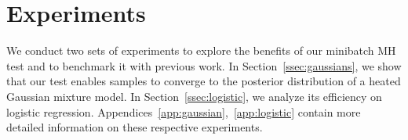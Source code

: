 \documentclass{article}
\newtheorem{theorem}{Theorem}
\begin{document}






\section{Experiments}\label{sec:experiments}

We conduct two sets of experiments to explore the benefits of our minibatch MH test and to
benchmark it with previous work. In Section~\ref{ssec:gaussians}, we show that our test enables
samples to converge to the posterior distribution of a heated Gaussian mixture model. In
Section~\ref{ssec:logistic}, we analyze its efficiency on logistic regression. 
Appendices~\ref{app:gaussian},~\ref{app:logistic} %
contain more detailed information on these respective experiments.
\end{document}
